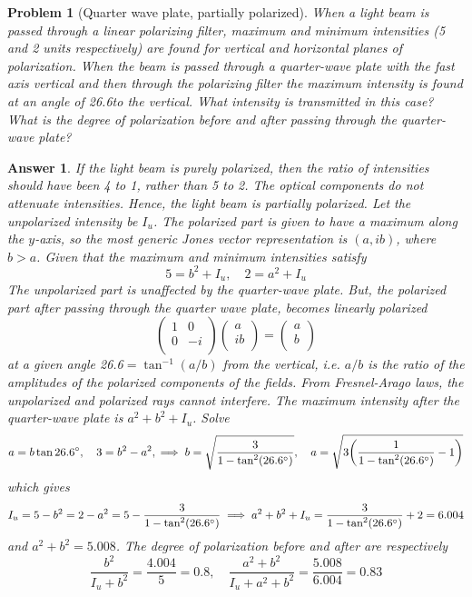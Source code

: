 \documentclass[a4paper]{article}
\newtheorem{ans}{Answer}[section]
\theoremstyle{new}
\newtheorem{qns}{Problem}[section]
\begin{document}
\begin{qns}[Quarter wave plate, partially polarized]
When a light beam is passed through a linear polarizing filter, maximum and minimum intensities (5 and 2 units respectively) are found for vertical and horizontal planes of polarization. When the beam is passed through a quarter-wave plate with the fast axis vertical and then through the polarizing filter the maximum intensity is found at an angle of 26.6\degree to the vertical. What intensity is transmitted in this case? What is the degree of polarization before and after passing through the quarter-wave plate?
\end{qns}
\begin{ans}
If the light beam is purely polarized, then the ratio of intensities should have been 4 to 1, rather than 5 to 2. The optical components do not attenuate intensities. Hence, the light beam is partially polarized. Let the unpolarized intensity be $I_u$. The polarized part is given to have a maximum along the $y$-axis, so the most generic Jones vector representation is $(a,ib)$, where $b>a$. Given that the maximum and minimum intensities satisfy
$$5=b^2+I_u,\quad 2=a^2+I_u$$
The unpolarized part is unaffected by the quarter-wave plate. But, the polarized part after passing through the quarter wave plate, becomes linearly polarized
$$\begin{pmatrix}1&0\\0&-i\\\end{pmatrix}\begin{pmatrix}a\\ib\\\end{pmatrix}=\begin{pmatrix}a\\b\\\end{pmatrix}$$
at a given angle 26.6\degree$=\tan^{-1}(a/b)$ from the vertical, i.e. $a/b$ is the ratio of the amplitudes of the polarized components of the fields. From Fresnel-Arago laws, the unpolarized and polarized rays cannot interfere. The maximum intensity after the quarter-wave plate is $a^2+b^2+I_u$. Solve
$$a=b\tan26.6\degree,\quad 3=b^2-a^2,\implies b=\sqrt{\frac{3}{1-\tan^2(26.6\degree)}},\quad  a=\sqrt{3\bigg(\frac{1}{1-\tan^2(26.6\degree)}-1\bigg)}$$
which gives
$$I_u=5-b^2=2-a^2=5-\frac{3}{1-\tan^2(26.6\degree)}\implies a^2+b^2+I_u=\frac{3}{1-\tan^2(26.6\degree)}+2=6.004$$
and $a^2+b^2=5.008$. The degree of polarization before and after are respectively
$$\frac{b^2}{I_u+b^2}=\frac{4.004}{5}=0.8,\quad\frac{a^2+b^2}{I_u+a^2+b^2}=\frac{5.008}{6.004}=0.83$$
\end{ans}
\end{document}
